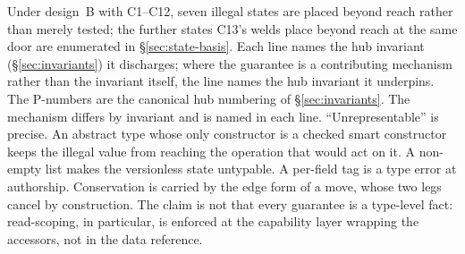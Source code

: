 Under design~B with C1--C12, seven illegal states are placed beyond reach rather than
merely tested; the further states C13's welds place beyond reach at the same door are
enumerated in \S\ref{sec:state-basis}. Each line names the hub invariant
(\S\ref{sec:invariants}) it discharges; where the guarantee is a contributing
mechanism rather than the invariant itself, the line names the hub invariant it
underpins. The P-numbers
are the canonical hub numbering of \S\ref{sec:invariants}. The mechanism differs by
invariant and is named in each line. ``Unrepresentable'' is precise. An abstract type
whose only constructor is a checked smart constructor keeps the illegal value from
reaching the operation that would act on it. A non-empty list makes the versionless state
untypable. A per-field tag is a type error at authorship. Conservation is carried by the
edge form of a move, whose two legs cancel by construction. The claim is not that every
guarantee is a type-level fact: read-scoping, in particular, is enforced at the
capability layer wrapping the accessors, not in the data reference.

